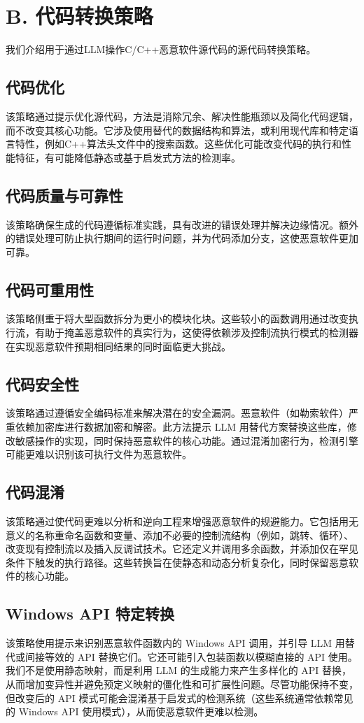 \section{B. 代码转换策略}
我们介绍用于通过LLM操作C/C++恶意软件源代码的源代码转换策略。

\subsection{代码优化}
该策略通过提示优化源代码，方法是消除冗余、解决性能瓶颈以及简化代码逻辑，而不改变其核心功能。它涉及使用替代的数据结构和算法，或利用现代库和特定语言特性，例如C++算法头文件中的搜索函数。这些优化可能改变代码的执行和性能特征，有可能降低静态或基于启发式方法的检测率。

\subsection{代码质量与可靠性}
该策略确保生成的代码遵循标准实践，具有改进的错误处理并解决边缘情况。额外的错误处理可防止执行期间的运行时问题，并为代码添加分支，这使恶意软件更加可靠。

\subsection{代码可重用性}
该策略侧重于将大型函数拆分为更小的模块化块。这些较小的函数调用通过改变执行流，有助于掩盖恶意软件的真实行为，这使得依赖涉及控制流执行模式的检测器在实现恶意软件预期相同结果的同时面临更大挑战。

\subsection{代码安全性}
该策略通过遵循安全编码标准来解决潜在的安全漏洞。恶意软件（如勒索软件）严重依赖加密库进行数据加密和解密。此方法提示 LLM 用替代方案替换这些库，修改敏感操作的实现，同时保持恶意软件的核心功能。通过混淆加密行为，检测引擎可能更难以识别该可执行文件为恶意软件。

\subsection{代码混淆}
该策略通过使代码更难以分析和逆向工程来增强恶意软件的规避能力。它包括用无意义的名称重命名函数和变量、添加不必要的控制流结构（例如，跳转、循环）、改变现有控制流以及插入反调试技术。它还定义并调用多余函数，并添加仅在罕见条件下触发的执行路径。这些转换旨在使静态和动态分析复杂化，同时保留恶意软件的核心功能。

\subsection{Windows API 特定转换}
该策略使用提示来识别恶意软件函数内的 Windows API 调用，并引导 LLM 用替代或间接等效的 API 替换它们。它还可能引入包装函数以模糊直接的 API 使用。我们不是使用静态映射，而是利用 LLM 的生成能力来产生多样化的 API 替换，从而增加变异性并避免预定义映射的僵化性和可扩展性问题。尽管功能保持不变，但改变后的 API 模式可能会混淆基于启发式的检测系统（这些系统通常依赖常见的 Windows API 使用模式），从而使恶意软件更难以检测。

